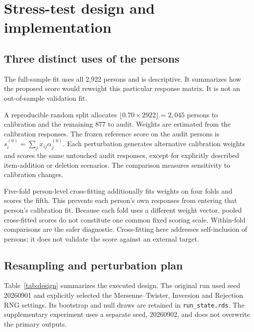 \documentclass[11pt,a4paper,oneside,headings=normal,parskip=half]{scrreprt}
\newcommand{\code}[1]{\nolinkurl{#1}}
\begin{document}
\chapter{Stress-test design and implementation}\label{ch:design}
\section{Three distinct uses of the persons}
The full-sample fit uses all 2,922 persons and is descriptive. It summarizes how the proposed score would reweight this particular response matrix. It is not an out-of-sample validation fit.

A reproducible random split allocates $\lfloor0.70\times2922\rfloor=2,045$ persons to calibration and the remaining 877 to audit. Weights are estimated from the calibration responses. The frozen reference score on the audit persons is $s_i^{(0)}=\sum_jx_{ij}\alpha_j^{(0)}$. Each perturbation generates alternative calibration weights and scores the same untouched audit responses, except for explicitly described item-addition or deletion scenarios. The comparison measures sensitivity to calibration changes.

Five-fold person-level cross-fitting additionally fits weights on four folds and scores the fifth. This prevents each person's own responses from entering that person's calibration fit. Because each fold uses a different weight vector, pooled cross-fitted scores do not constitute one common fixed scoring scale. Within-fold comparisons are the safer diagnostic. Cross-fitting here addresses self-inclusion of persons; it does not validate the score against an external target.

\section{Resampling and perturbation plan}
Table~\ref{tab:design} summarizes the executed design. The original run used seed 20260901 and explicitly selected the Mersenne--Twister, Inversion and Rejection RNG settings. Its bootstrap and null draws are retained in \code{run_state.rds}. The supplementary experiment uses a separate seed, 20260902, and does not overwrite the primary outputs.
\end{document}

